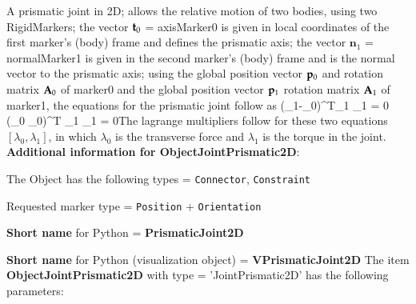 \label{sec:item:ObjectJointPrismatic2D}
A prismatic joint in 2D; allows the relative motion of two bodies, using two RigidMarkers; the vector $\mathbf{t}_0$ = axisMarker0 is given in local coordinates of the first marker's (body) frame and defines the prismatic axis; the vector $\mathbf{n}_1$ = normalMarker1 is given in the second marker's (body) frame and is the normal vector to the prismatic axis; using the global position vector $\mathbf{p}_0$ and rotation matrix $\mathbf{A}_0$ of marker0 and the global position vector $\mathbf{p}_1$ rotation matrix $\mathbf{A}_1$ of marker1, the equations for the prismatic joint follow as \be (\pv_1-\pv_0)^T\cdot \Am_1 \cdot {}_1 = 0 \ee  \be (\Am_0 \cdot \tv_0)^T \cdot \Am_1 \cdot {}_1 = 0\ee The lagrange multipliers follow for these two equations $[\lambda_0,\lambda_1]$, in which $\lambda_0$ is the transverse force and $\lambda_1$ is the torque in the joint.\vspace{12pt}
 \\{\bf Additional information for ObjectJointPrismatic2D}:
\bi
  \item The Object has the following types = \texttt{Connector}, \texttt{Constraint}
  \item Requested marker type = \texttt{Position} + \texttt{Orientation}
  \item {\bf Short name} for Python = {\bf PrismaticJoint2D}  \item {\bf Short name} for Python (visualization object) = {\bf VPrismaticJoint2D}\ei
\vspace{12pt} \noindent The item {\bf ObjectJointPrismatic2D} with type = 'JointPrismatic2D' has the following parameters:\vspace{-1cm}\\ 
